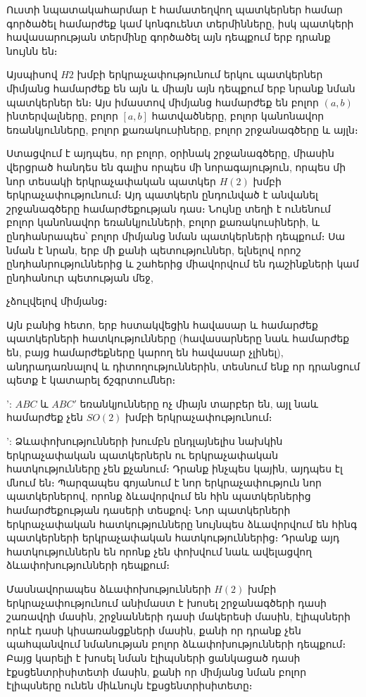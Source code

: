 \documentclass[./main.tex]{subfiles}
\begin{document}
\par Ուստի նպատակահարմար է համատեղվող պատկերներ համար գործածել համարժեք կամ կոնգուենտ տերմինները, իսկ պատկերի հավասարության տերմինը գործածել այն դեպքում
երբ դրանք նույնն են։ 

\par Այսպիսով $H2$ խմբի երկրաչափությունում երկու պատկերներ միմյանց համարժեք են այն և միայն այն դեպքում երբ նրանք նման պատկերներ են։ Այս իմաստով
միմյանց համարժեք են բոլոր $(a,b)$ ինտերվալները, բոլոր $[a,b]$ հատվածները, բոլոր կանոնավոր եռանկյունները, բոլոր քառակուսիները, բոլոր շրջանագծերը և այլն։

\par Ստացվում է այդպես, որ բոլոր, օրինակ շրջանագծերը, միասին վերցրած հանդես են գալիս որպես մի նորագայություն, որպես մի
նոր տեսակի երկրաչափական պատկեր $H(2)$ խմբի երկրաչափությունում։ Այդ պատկերն ընդունված է անվանել շրջանագծերը համարժեքության դաս։ Նույնը տեղի է ունենում բոլոր
կանոնավոր եռանկյունների, բոլոր քառակուսիների, և ընդհանրապես՝ բոլոր միմյանց նման պատկերների դեպքում։ Սա նման է նրան, երբ մի քանի պետություններ, ելնելով որոշ
ընդհանրություններից և շահերից միավորվում են դաշինքների կամ ընդհանուր պետության մեջ,


չձուլվելով միմյանց։ %
\par Այն բանից հետո, երբ հստակվեցին  հավասար և համարժեք պատկերների հատկությունները  
(հավասարները նաև համարժեք են, բայց համարժեքները կարող են հավասար չլինել), անդրադառնալով  և  դիտողություններին, տեսնում ենք որ դրանցում պետք 
է կատարել ճշգրտումներ։

': $ABC$ և $ABC'$ եռանկյունները ոչ միայն տարբեր են, այլ նաև համարժեք չեն $SO(2)$ խմբի երկրաչափությունում։

': Ձևափոխությունների խումբն ընդլայնելիս նախկին երկրաչափական պատկերներն ու երկրաչափական հատկությունները չեն քչանում։ Դրանք ինչպես կային, այդպես էլ մնում են։ 
Պարզապես գոյանում է նոր երկրաչափություն նոր պատկերներով, որոնք ձևավորվում են հին պատկերներից համարժեքության դասերի տեսքով։ Նոր պատկերների երկրաչափական 
հատկությունները նույնպես ձևավորվում են հինգ պատկերների երկրաչափական հատկություններից։ 
Դրանք այդ հատկություններն են որոնք չեն փոխվում նաև ավելացվող ձևափոխությունների դեպքում։ 

\par Մասնավորապես ձևափոխությունների $H(2)$ խմբի երկրաչափությունում անիմաստ է խոսել շրջանագծերի դասի շառավղի մասին, շրջնանների դասի մակերեսի մասին, 
էլիպսների որևէ դասի կիսառանցքների մասին, քանի որ դրանք չեն պահպանվում նմանության բոլոր ձևափոխությունների դեպքում։ Բայց կարելի է խոսել նման էլիպսների 
ցանկացած դասի էքսցենտրիսիտետի մասին, քանի որ միմյանց նման բոլոր էլիպսները ունեն միևնույն էքսցենտրիսիտետը։
\end{document}
